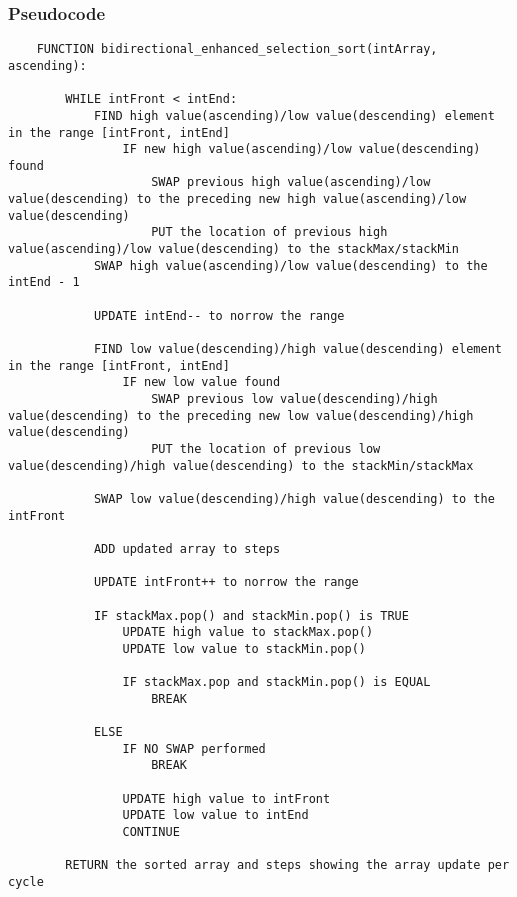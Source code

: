 \documentclass{article}
\begin{document}
\subsubsection*{Pseudocode}
\begin{lstlisting}
    FUNCTION bidirectional_enhanced_selection_sort(intArray, ascending):
    
        WHILE intFront < intEnd:
            FIND high value(ascending)/low value(descending) element in the range [intFront, intEnd]
                IF new high value(ascending)/low value(descending) found
                    SWAP previous high value(ascending)/low value(descending) to the preceding new high value(ascending)/low value(descending)
                    PUT the location of previous high value(ascending)/low value(descending) to the stackMax/stackMin
            SWAP high value(ascending)/low value(descending) to the intEnd - 1
            
            UPDATE intEnd-- to norrow the range

            FIND low value(descending)/high value(descending) element in the range [intFront, intEnd]
                IF new low value found
                    SWAP previous low value(descending)/high value(descending) to the preceding new low value(descending)/high value(descending)
                    PUT the location of previous low value(descending)/high value(descending) to the stackMin/stackMax

            SWAP low value(descending)/high value(descending) to the intFront

            ADD updated array to steps
            
            UPDATE intFront++ to norrow the range

            IF stackMax.pop() and stackMin.pop() is TRUE
                UPDATE high value to stackMax.pop()
                UPDATE low value to stackMin.pop()

                IF stackMax.pop and stackMin.pop() is EQUAL
                    BREAK

            ELSE
                IF NO SWAP performed
                    BREAK
                
                UPDATE high value to intFront
                UPDATE low value to intEnd
                CONTINUE
        
        RETURN the sorted array and steps showing the array update per cycle
    

\end{lstlisting}
\end{document}

